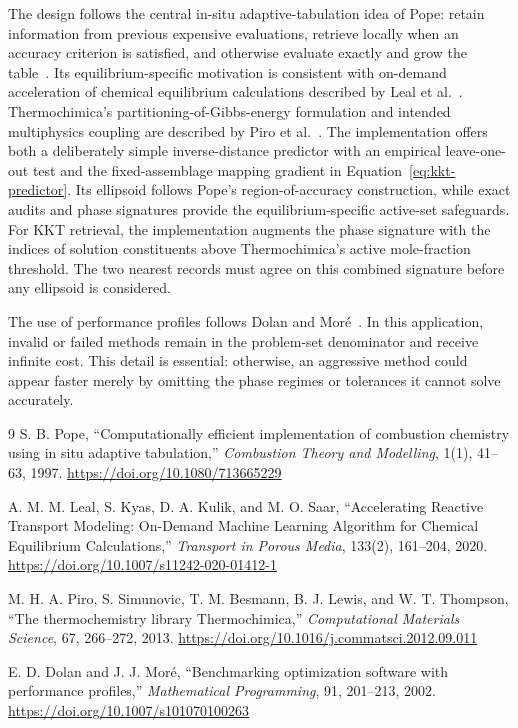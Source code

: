 \documentclass[11pt]{article}
\begin{document}
The design follows the central in-situ adaptive-tabulation idea of Pope: retain information from
previous expensive evaluations, retrieve locally when an accuracy criterion is satisfied, and
otherwise evaluate exactly and grow the table~\cite{pope1997}.  Its equilibrium-specific motivation
is consistent with on-demand acceleration of chemical equilibrium calculations described by Leal
et al.~\cite{leal2020}.  Thermochimica's partitioning-of-Gibbs-energy formulation and intended
multiphysics coupling are described by Piro et al.~\cite{piro2013}.  The implementation offers both
a deliberately simple inverse-distance
predictor with an empirical leave-one-out test and the fixed-assemblage mapping gradient in
Equation~\eqref{eq:kkt-predictor}.  Its ellipsoid follows Pope's region-of-accuracy construction,
while exact audits and phase signatures provide the equilibrium-specific active-set safeguards.
For KKT retrieval, the implementation augments the phase signature with the indices of solution
constituents above Thermochimica's active mole-fraction threshold.  The two nearest records must
agree on this combined signature before any ellipsoid is considered.

The use of performance profiles follows Dolan and Mor\'e~\cite{dolan2002}.  In this application,
invalid or failed methods remain in the problem-set denominator and receive infinite cost.  This
detail is essential: otherwise, an aggressive method could appear faster merely by omitting the
phase regimes or tolerances it cannot solve accurately.

\begin{thebibliography}{9}
  S. B. Pope,
  ``Computationally efficient implementation of combustion chemistry using in situ adaptive
  tabulation,''
  \emph{Combustion Theory and Modelling}, 1(1), 41--63, 1997.
  \url{https://doi.org/10.1080/713665229}

  A. M. M. Leal, S. Kyas, D. A. Kulik, and M. O. Saar,
  ``Accelerating Reactive Transport Modeling: On-Demand Machine Learning Algorithm for Chemical
  Equilibrium Calculations,''
  \emph{Transport in Porous Media}, 133(2), 161--204, 2020.
  \url{https://doi.org/10.1007/s11242-020-01412-1}

  M. H. A. Piro, S. Simunovic, T. M. Besmann, B. J. Lewis, and W. T. Thompson,
  ``The thermochemistry library Thermochimica,''
  \emph{Computational Materials Science}, 67, 266--272, 2013.
  \url{https://doi.org/10.1016/j.commatsci.2012.09.011}

  E. D. Dolan and J. J. Mor\'e,
  ``Benchmarking optimization software with performance profiles,''
  \emph{Mathematical Programming}, 91, 201--213, 2002.
  \url{https://doi.org/10.1007/s101070100263}
\end{thebibliography}
\end{document}
